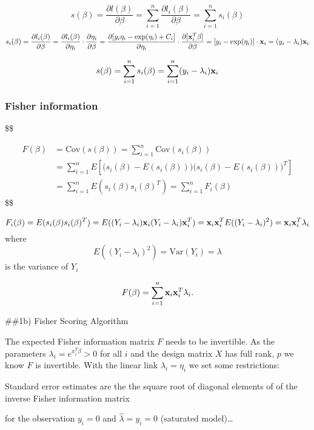 \documentclass[
]{article}
\begin{document}
\[s(\beta)=\frac{\partial l(\beta)}{\partial \beta}=
\sum_{i=1}^n \frac{\partial l_i(\beta)}{\partial \beta}=
\sum_{i=1}^n s_i(\beta)
\] \[
s_i(\beta)=\frac{\partial l_i(\beta)}{\partial \beta}=\frac{\partial l_i(\beta)}{\partial \eta_i}\cdot \frac{\partial \eta_i}{\partial \beta}=\frac{\partial [y_i\eta_i-\exp(\eta_i)+C_i]}{\partial \eta_i}\cdot \frac{\partial [{\bf x}_i^T\beta ]}{\partial \beta} =[y_i-\exp(\eta_i)]\cdot {\bf x}_i=(y_i-\lambda_i){\bf x}_i \]

\[s(\beta)=\sum_{i=1}^n s_i(\beta)=\sum_{i=1}^n (y_i-\lambda_i){\bf x}_i\]

\hypertarget{fisher-information}{%
\subsubsection{Fisher information}\label{fisher-information}}

\$\$

\begin{align} F(\beta) &= \text{Cov}(s(\beta)) =   \sum_{i=1}^n \text{Cov}(s_i(\beta)) \\
&= \sum_{i=1}^n E\left[\Big(s_i(\beta) - E(s_i(\beta))\Big)\Big(s_i(\beta)-E(s_i(\beta))\Big)^T\right] \\
&= \sum_{i=1}^n E(s_i(\beta)s_i(\beta)^T) = \sum_{i=1}^n F_i(\beta) 
\end{align} \$\$

\[ F_i(\beta) = E(s_i(\beta)s_i(\beta)^T) = E((Y_i-\lambda_i){\bf x}_i(Y_i-\lambda_i){\bf x}_i^T) = {\bf x}_i{\bf x}_i^T E((Y_i-\lambda_i)^2) = {\bf x}_i{\bf x}_i^T \lambda_i \]
where \[E((Y_i-\lambda_i)^2)=\text{Var}(Y_i)=\lambda\] is the variance
of \(Y_i\)

\[F(\beta) = \sum_{i=1}^n {\bf x}_i{\bf x}_i^T \lambda_i.\]

\#\#1b) Fisher Scoring Algorithm

The expected Fisher information matrix \(F\) needs to be invertible. As
the parameters \(\lambda_i=e^{x_i^T\beta}>0\) for all \(i\) and the
design matrix \(X\) has full rank, \(p\) we know \(F\) is invertible.
With the linear link \(\lambda_i = \eta_i\) we set some restrictions:

Standard error estimates are the the square root of diagonal elements of
of the inverse Fisher information matrix

for the observation \(y_i=0\) and \(\hat{\lambda}=y_i=0\) (saturated
model)\ldots{}
\end{document}
